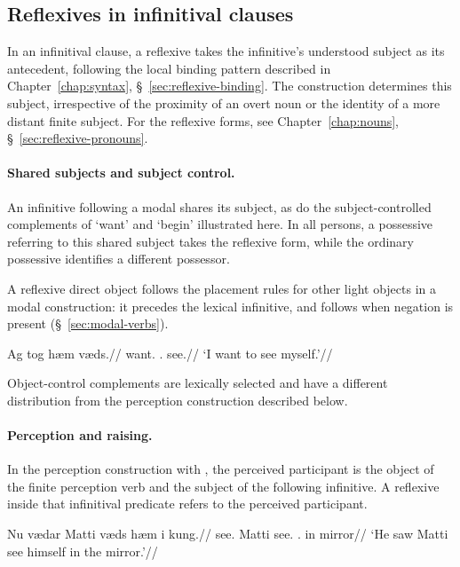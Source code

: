 \subsection{Reflexives in infinitival clauses}
\label{sec:nonfinite-reflexives}

In an infinitival clause, a reflexive takes the infinitive's understood subject as its antecedent, following the local binding pattern described in Chapter~\ref{chap:syntax}, \S~\ref{sec:reflexive-binding}. The construction determines this subject, irrespective of the proximity of an overt noun or the identity of a more distant finite subject. For the reflexive forms, see Chapter~\ref{chap:nouns}, \S~\ref{sec:reflexive-pronouns}.

\paragraph{Shared subjects and subject control.}
An infinitive following a modal shares its subject, as do the subject-controlled complements of  `want' and  `begin' illustrated here. In all persons, a possessive referring to this shared subject takes the reflexive form, while the ordinary possessive identifies a different possessor.

A reflexive direct object follows the placement rules for other light objects in a modal construction: it precedes the lexical infinitive, and follows  when negation is present (\S~\ref{sec:modal-verbs}).

\pex
\begingl
\gla Ag tog hæm væds.//
\glb \First{}\Sg{} want.\Pres{} \Refl{}.\Acc{} see.\Inf{}//
\glft `I want to see myself.'//
\endgl
\xe

Object-control complements are lexically selected and have a different distribution from the perception construction described below.

\paragraph{Perception and raising.}
In the perception construction with , the perceived participant is the object of the finite perception verb and the subject of the following infinitive. A reflexive inside that infinitival predicate refers to the perceived participant.

\pex
\begingl
\gla Nu vædar Matti væds hæm i kung.//
\glb \Third{}\Sg{} see.\Pst{} Matti see.\Inf{} \Refl{}.\Acc{} in mirror//
\glft `He saw Matti see himself in the mirror.'//
\endgl
\xe

